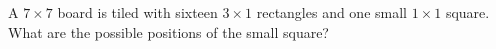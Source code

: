 A $7 \times 7$ board is tiled with sixteen $3 \times 1$ rectangles and one small $1 \times 1$ square. What are the possible positions of the small square?

